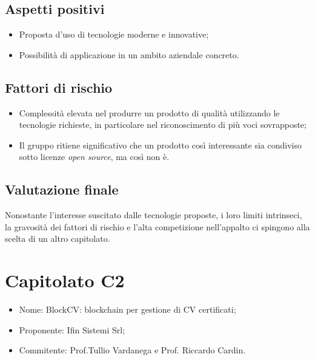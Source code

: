 \documentclass[openany,12pt,a4paper]{report}
\begin{document}
\subsection{Aspetti positivi}

\begin{itemize}
    \item Proposta d'uso di tecnologie moderne e innovative;
    
    \item Possibilità di applicazione in un ambito aziendale concreto.
\end{itemize}
\subsection{Fattori di rischio}

\begin{itemize}
    \item Complessità elevata nel produrre un prodotto di qualità utilizzando le tecnologie richieste, in particolare nel riconoscimento di più voci sovrapposte;
    
    \item Il gruppo ritiene significativo che un prodotto così interessante sia condiviso sotto licenze \textit{open source}, ma così non è.
\end{itemize}

\subsection{Valutazione finale}

Nonostante l'interesse suscitato dalle tecnologie proposte, i loro limiti intrinseci, la gravosità dei fattori di rischio e l'alta competizione nell'appalto ci spingono alla scelta di un altro capitolato.


\section{Capitolato C2}

\begin{itemize}
    \item{Nome:} BlockCV: blockchain per gestione di CV certificati;
    \item{Proponente:} Ifin Sistemi Srl;
    \item{Commitente:} Prof.Tullio Vardanega e Prof. Riccardo Cardin.
\end{itemize}
\end{document}
